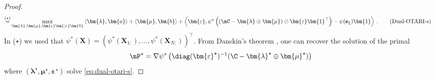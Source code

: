 \begin{proof}
\begin{align}
    \stackrel{(\star)}{=} &\max_{\bm{\lambda}, \bm{\mu}, \bm{\varepsilon} \bm{>} \bm{0}} \: \langle \bm{\lambda}, \bm{a} \rangle + \langle \bm{\mu}, \bm{b} \rangle + \left\langle \bm{\varepsilon}, \psi^*\left((\mC - \bm{\lambda} \oplus \bm{\mu}) \oslash \bm{\varepsilon} \bm{1}^\top \right) - \psi(\mathbf{e}_\xi) \bm{1} \right\rangle \:.
    \label{eq:dual-otari-s}
    \tag{Dual-OTARI-s}
\end{align}
In ($\star$) we used that $\psi^*(\mathbf{X}) = \left(\psi^*(\mathbf{X}_{1:}), ..., \psi^*(\mathbf{X}_{N:})\right)^\top$.
From Danskin's theorem \citep{danskin1966theory}, one can recover the solution of the primal
\begin{align}
    \mP^\star = \nabla \psi^* \left(\diag(\bm{\varepsilon}^\star)^{-1} (\C - \bm{\lambda}^\star \oplus \bm{\mu}^\star) \right)
\end{align}
where $(\bm{\lambda}^\star, \bm{\mu}^\star, \bm{\varepsilon}^\star)$ solve \eqref{eq:dual-otari-s}.
\end{proof}

